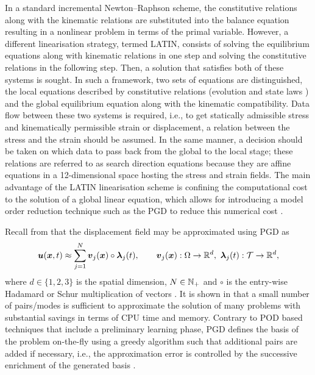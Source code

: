 In a standard incremental Newton--Raphson scheme, the constitutive relations along with the kinematic relations are substituted into the balance equation resulting in a nonlinear problem in terms of the primal variable. However, a different linearisation strategy, termed LATIN, consists of solving the equilibrium equations along with kinematic relations in one step and solving the constitutive relations in the following step. Then, a solution that satisfies both of these systems is sought. In such a framework, two sets of equations are distinguished, the local equations described by constitutive relations {(evolution and state laws \parencite{lemaitre1996course})} and the global equilibrium equation along with the kinematic compatibility. Data flow between these two systems is required, i.e., to get statically admissible stress and kinematically permissible strain or displacement, a relation between the stress and the strain should be assumed. In the same manner, a decision should be taken on which data to pass back from the global to the local stage; these relations are referred to as search direction equations because they are {affine equations} in a 12-dimensional space hosting the stress and strain fields. The main advantage of the LATIN linearisation scheme is confining the computational cost to the solution of a global linear equation, which allows for introducing a model order reduction technique such as the PGD to reduce this numerical cost \parencite{chinesta2014separated}.

Recall from  that the displacement field may be approximated using PGD as
\begin{equation}
	{\mbox{$\bm  u$}}(\mbox{$\bm  x$},t) \approx \displaystyle  \sum_{j=1}^{N} {\mbox{$\bm  v$}}_j(\mbox{$\bm  x$}) \circ \mbox{$\bm \lambda$}_j(t) , {\qquad {\mbox{$\bm  v$}}_j(\mbox{$\bm  x$}):\Omega \rightarrow {\mathbb{ R}}^{d},\  \mbox{$\bm \lambda$}_j(t):{\cal T} \rightarrow {\mathbb{ R}}^{d},}
\end{equation}
where {$d\in\{1,2,3\}$ is the spatial dimension}, $N\in{\mathbb{ N}}_{+}$ and $\circ$ is the entry-wise Hadamard or Schur multiplication of vectors \parencite{chinesta2014separated,cueto2016proper}. It is shown in \parencite{chinesta2014separated} that a small number of pairs/modes is sufficient to approximate the solution of many problems with substantial savings in terms of CPU time and memory. Contrary to POD based techniques that include a preliminary learning phase, PGD defines the basis of the problem on-the-fly using a greedy algorithm such that additional pairs are added if necessary, i.e., the approximation error is controlled by the successive enrichment of the generated basis \parencite{chinesta2013proper}.

